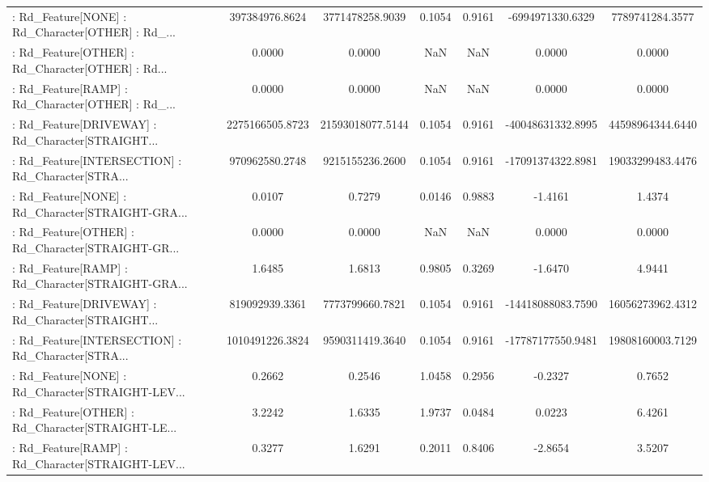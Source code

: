 \begin{longtable}{p{4cm}cccccc}
 : Rd\_Feature[NONE] : Rd\_Character[OTHER] : Rd\_... &    397384976.8624 &   3771478258.9039 &  0.1054 &       0.9161 &   -6994971330.6329 &   7789741284.3577 \\
 : Rd\_Feature[OTHER] : Rd\_Character[OTHER] : Rd... &            0.0000 &            0.0000 &     NaN &          NaN &             0.0000 &            0.0000 \\
 : Rd\_Feature[RAMP] : Rd\_Character[OTHER] : Rd\_... &            0.0000 &            0.0000 &     NaN &          NaN &             0.0000 &            0.0000 \\
 : Rd\_Feature[DRIVEWAY] : Rd\_Character[STRAIGHT... &   2275166505.8723 &  21593018077.5144 &  0.1054 &       0.9161 &  -40048631332.8995 &  44598964344.6440 \\
 : Rd\_Feature[INTERSECTION] : Rd\_Character[STRA... &    970962580.2748 &   9215155236.2600 &  0.1054 &       0.9161 &  -17091374322.8981 &  19033299483.4476 \\
 : Rd\_Feature[NONE] : Rd\_Character[STRAIGHT-GRA... &            0.0107 &            0.7279 &  0.0146 &       0.9883 &            -1.4161 &            1.4374 \\
 : Rd\_Feature[OTHER] : Rd\_Character[STRAIGHT-GR... &            0.0000 &            0.0000 &     NaN &          NaN &             0.0000 &            0.0000 \\
 : Rd\_Feature[RAMP] : Rd\_Character[STRAIGHT-GRA... &            1.6485 &            1.6813 &  0.9805 &       0.3269 &            -1.6470 &            4.9441 \\
 : Rd\_Feature[DRIVEWAY] : Rd\_Character[STRAIGHT... &    819092939.3361 &   7773799660.7821 &  0.1054 &       0.9161 &  -14418088083.7590 &  16056273962.4312 \\
 : Rd\_Feature[INTERSECTION] : Rd\_Character[STRA... &   1010491226.3824 &   9590311419.3640 &  0.1054 &       0.9161 &  -17787177550.9481 &  19808160003.7129 \\
 : Rd\_Feature[NONE] : Rd\_Character[STRAIGHT-LEV... &            0.2662 &            0.2546 &  1.0458 &       0.2956 &            -0.2327 &            0.7652 \\
 : Rd\_Feature[OTHER] : Rd\_Character[STRAIGHT-LE... &            3.2242 &            1.6335 &  1.9737 &       0.0484 &             0.0223 &            6.4261 \\
 : Rd\_Feature[RAMP] : Rd\_Character[STRAIGHT-LEV... &            0.3277 &            1.6291 &  0.2011 &       0.8406 &            -2.8654 &            3.5207 \\

\end{longtable}
